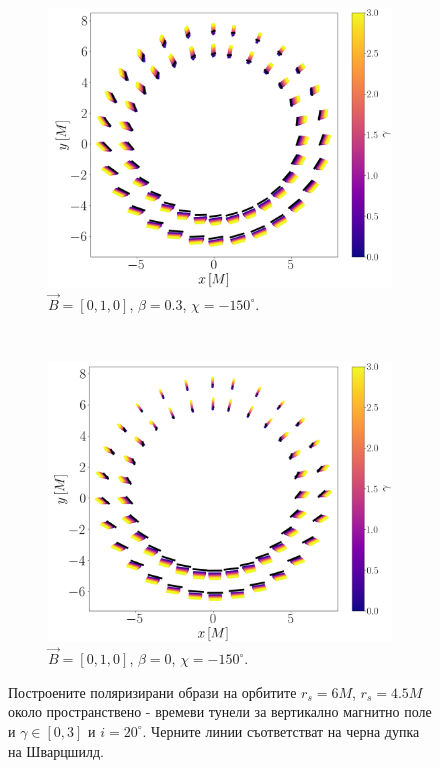 \begin{figure}[!htb]
	\begin{subfigure}{7cm}
		\hspace{0.0em}
		\includegraphics[scale = 0.23]{WH_alpha_Vert_Field.png}
		\caption{$\vec{B} = [0, 1, 0]$, $\beta = 0.3$, $\chi = -150^\circ$.} 
	\end{subfigure}\,\,\,
	\begin{subfigure}{7cm}
		\hspace{0.2em}
		\includegraphics[scale = 0.23]{WH_alpha_Vert_Field_beta_zero.png}
		\caption{$\vec{B} = [0, 1, 0]$, $\beta = 0$, $\chi = -150^\circ$.}
	\end{subfigure}
	\caption[Поляризирани образи около пространствено - времеви тунели за вертикално магнитно поле.]{\small Построените поляризирани образи на орбитите $r_s = 6M$, $r_s = 4.5M$ около пространствено - времеви тунели за вертикално магнитно поле и $\gamma \in[0,3]$ и $i = 20^\circ$. Черните линии съответстват на черна дупка на Шварцшилд.} 
	\label{WH_pol_vert_field}
\end{figure}

